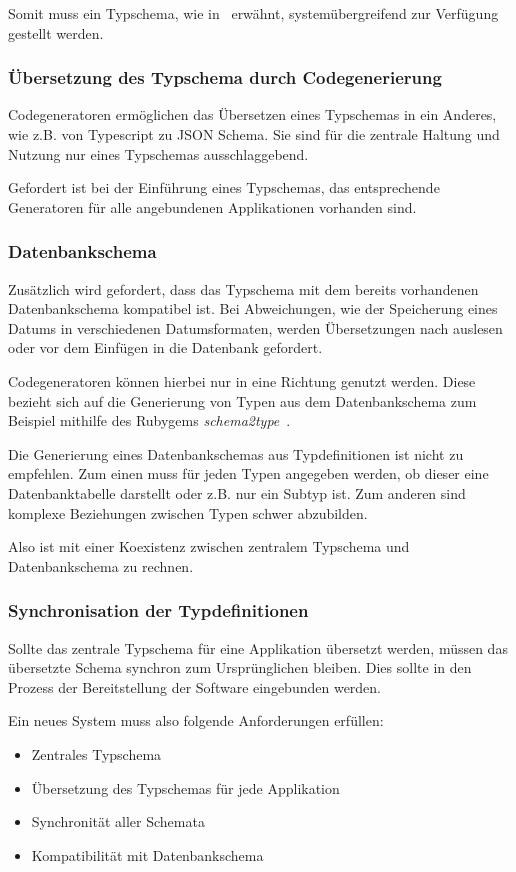 Somit muss ein Typschema, wie in~ erwähnt, systemübergreifend zur Verfügung gestellt werden.

\subsubsection{Übersetzung des Typschema durch Codegenerierung}
Codegeneratoren ermöglichen das Übersetzen eines Typschemas in ein Anderes, wie z.B. von Typescript zu JSON Schema.
Sie sind für die zentrale Haltung und Nutzung nur eines Typschemas ausschlaggebend.

Gefordert ist bei der Einführung eines Typschemas, das entsprechende Generatoren für alle angebundenen Applikationen vorhanden sind.

\subsubsection{Datenbankschema}
Zusätzlich wird gefordert, dass das Typschema mit dem bereits vorhandenen Datenbankschema kompatibel ist.
Bei Abweichungen, wie der Speicherung eines Datums in verschiedenen Datumsformaten,
werden Übersetzungen nach auslesen oder vor dem Einfügen in die Datenbank gefordert.

Codegeneratoren können hierbei nur in eine Richtung genutzt werden.
Diese bezieht sich auf die Generierung von Typen aus dem Datenbankschema zum Beispiel mithilfe des Rubygems \emph{schema2type}~\cite{schema2type}.

Die Generierung eines Datenbankschemas aus Typdefinitionen ist nicht zu empfehlen.
Zum einen muss für jeden Typen angegeben werden, ob dieser eine Datenbanktabelle darstellt oder z.B. nur ein Subtyp ist.
Zum anderen sind komplexe Beziehungen zwischen Typen schwer abzubilden.

Also ist mit einer Koexistenz zwischen zentralem Typschema und Datenbankschema zu rechnen.

\subsubsection{Synchronisation der Typdefinitionen}
Sollte das zentrale Typschema für eine Applikation übersetzt werden,
müssen das übersetzte Schema synchron zum Ursprünglichen bleiben. Dies sollte in den Prozess der Bereitstellung der Software eingebunden werden.

Ein neues System muss also folgende Anforderungen erfüllen:

\begin{itemize}
    \setlength\itemsep{-1em}
    \item Zentrales Typschema
    \item Übersetzung des Typschemas für jede Applikation
    \item Synchronität aller Schemata
    \item Kompatibilität mit Datenbankschema
\end{itemize}

